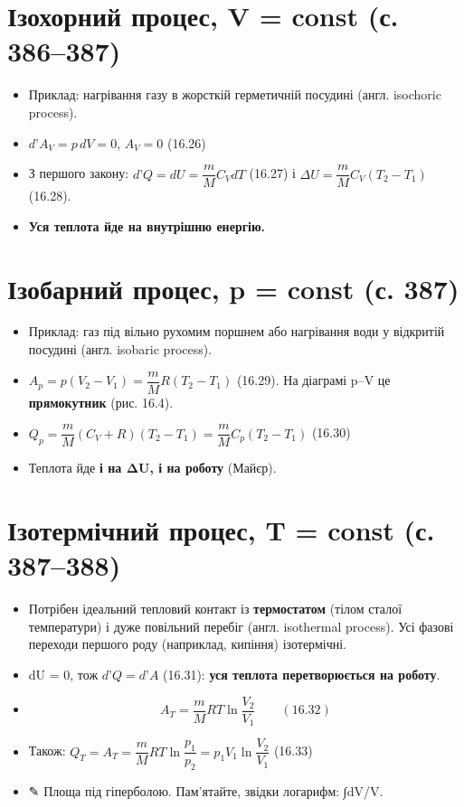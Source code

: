 \documentclass[11pt,a4paper,oneside]{book}
\newcommand{\pen}{{\sffamily\color{accent}✎}}
\begin{document}
\section*{Ізохорний процес, V = const (с. 386–387)}
\begin{itemize}
\item Приклад: нагрівання газу в жорсткій герметичній посудині (англ. isochoric process).
\item $d\text{'}A_V = p\,dV = 0$, $A_V = 0$ (16.26)
\item З першого закону: $d\text{'}Q = dU = \dfrac mMC_VdT$ (16.27) і $\Delta U = \dfrac mMC_V(T_2 - T_1)$ (16.28).
\item \textbf{Уся теплота йде на внутрішню енергію.}
\end{itemize}

\section*{Ізобарний процес, p = const (с. 387)}
\begin{itemize}
\item Приклад: газ під вільно рухомим поршнем або нагрівання води у відкритій посудині (англ. isobaric process).
\item $A_p = p(V_2 - V_1) = \dfrac mMR(T_2 - T_1)$ (16.29). На діаграмі p–V це \textbf{прямокутник} (рис. 16.4).
\item $Q_p = \dfrac mM(C_V + R)(T_2 - T_1) = \dfrac mMC_p(T_2 - T_1)$ (16.30)
\item Теплота йде \textbf{і на ΔU, і на роботу} (Майєр).
\end{itemize}

\section*{Ізотермічний процес, T = const (с. 387–388)}
\begin{itemize}
\item Потрібен ідеальний тепловий контакт із \textbf{термостатом} (тілом сталої температури) і дуже повільний перебіг (англ. isothermal process). Усі фазові переходи першого роду (наприклад, кипіння) ізотермічні.
\item dU = 0, тож $d\text{'}Q = d\text{'}A$ (16.31): \textbf{уся теплота перетворюється на роботу}.
\item \[A_T = \frac mMRT\ln\frac{V_2}{V_1}\qquad(16.32)\]
\item Також: $Q_T = A_T = \dfrac mMRT\ln\dfrac{p_1}{p_2} = p_1V_1\ln\dfrac{V_2}{V_1}$ (16.33)
\item \pen{} Площа під гіперболою. Пам'ятайте, звідки логарифм: ∫dV/V.
\end{itemize}
\end{document}
